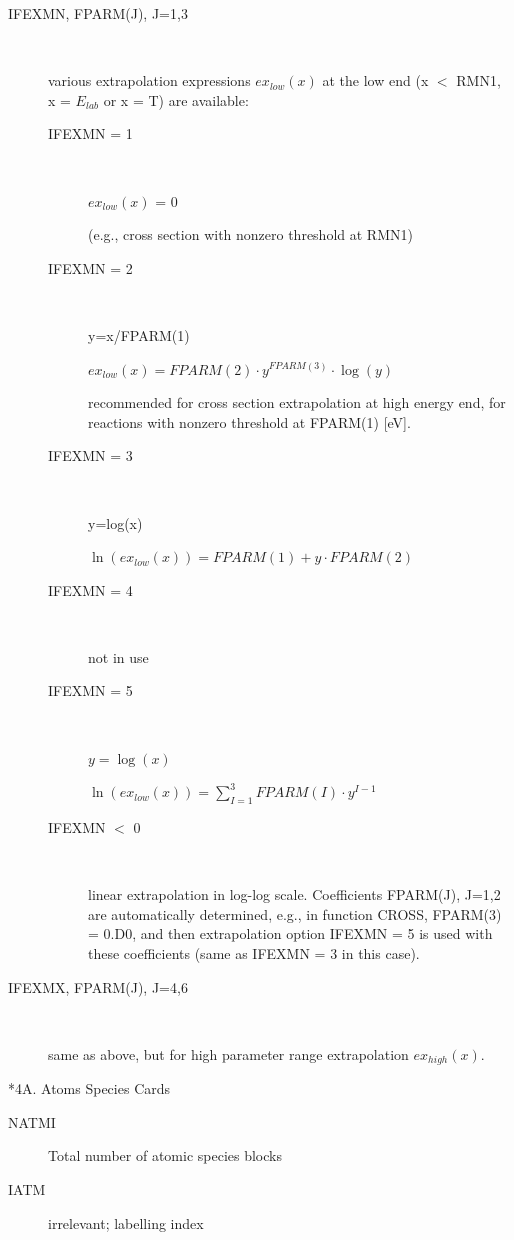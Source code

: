 \begin{description}
  \item[IFEXMN, FPARM(J), J=1,3] ~ 

        various extrapolation expressions $ex_{low}(x)$ at the low end (x $<$ RMN1, x =
        $E_{lab}$ or x = T) are available:
        \begin{description}
          \item[IFEXMN = 1] ~ 

                $ex_{low}(x)$ = 0 

                (e.g., cross section with nonzero threshold at RMN1)
          \item[IFEXMN = 2] ~

                y=x/FPARM(1) 

                $ex_{low}(x) = FPARM(2) \cdot y^{FPARM(3)} \cdot \log(y)$ 

                recommended for cross section extrapolation at high energy end, for reactions
                with nonzero threshold at FPARM(1) [\si{\electronvolt}].
          \item[IFEXMN = 3] ~ 

                y=log(x) 

                $\ln(ex_{low}(x)) = FPARM(1) + y \cdot FPARM(2) $
          \item[IFEXMN = 4] ~

                not in use
          \item[IFEXMN = 5] ~ 

                $y=\log(x)$ 

                $\ln(ex_{low}(x)) =\sum_{I=1}^3 FPARM(I) \cdot y^{I-1} $
          \item[IFEXMN $<$ 0] ~

                linear extrapolation in log-log scale.
                Coefficients FPARM(J), J=1,2 are automatically determined, e.g., in function
                CROSS, FPARM(3) = 0.D0, and then extrapolation option IFEXMN = 5 is used with
                these coefficients (same as IFEXMN = 3 in this case).
        \end{description}
  \item[IFEXMX, FPARM(J), J=4,6] ~ 

        same as above, but for high parameter range extrapolation $ex_{high}(x)$.

\end{description}

\medskip

*4A.
Atoms Species Cards
\begin{description}
  \item[NATMI] Total number of atomic
        species blocks
  \item[IATM] irrelevant; labelling index
\end{description}

